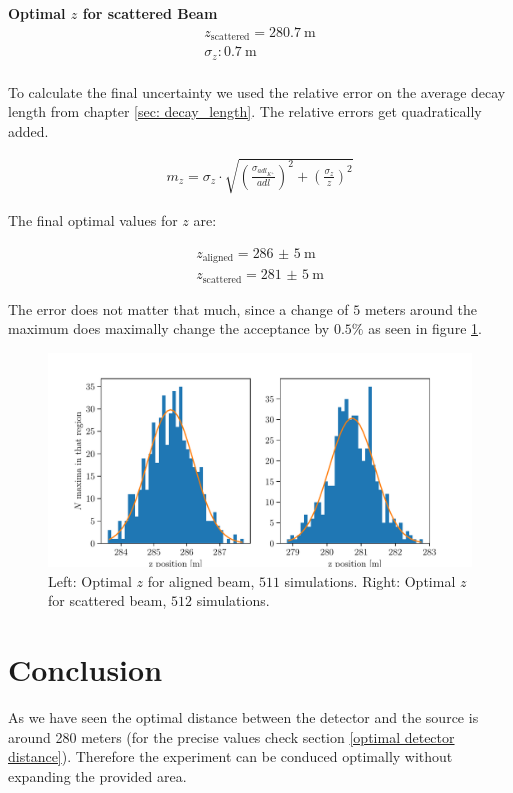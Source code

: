 \documentclass[12pt,a4paper,oneside,english]{article}
\begin{document}
	\textbf{Optimal $z$ for scattered Beam}
		\begin{align*}
		z_{\text{scattered}} = \SI{280.7}{\meter}\\
		\sigma _z  : \SI{0.7}{\meter}\\
		\end{align*}
		
		To calculate the final uncertainty we used the relative error on the average decay length from chapter \ref{sec: decay_length}. The relative errors get quadratically added.
		
		\begin{align}
			m_z = \sigma _z \cdot \sqrt{ \left(\frac{\sigma_{adl_{K^+}}}{adl}\right)^2 +  \left(\frac{\sigma_z}{z}\right)^2}
		\end{align}
		
		The final optimal values for $z$ are:
		
		\begin{align*}
			z_{\text{aligned}} =  \SI{286(5)}{\meter}\\
			z_{\text{scattered}} =  \SI{281(5)}{\meter}
		\end{align*}
		
		The error does not matter that much, since a change of $5$ meters around the maximum does maximally change the acceptance by $0.5\%$ as seen in figure \ref{fig:optimalzpos}.
		
\begin{figure}[H]
\centering
	\includegraphics[width=1\linewidth]{images/optimal_zpos.pdf}
	\caption{Left: Optimal $z$ for aligned beam, $511$ simulations. Right: Optimal $z$ for scattered beam, $512$ simulations.}
	\label{fig:optimalzpos}
\end{figure}

\section{Conclusion}
As we have seen the optimal distance between the detector and the source is around 280 meters (for the precise values check section \ref{optimal detector distance}). Therefore the experiment can be conduced optimally without expanding the provided area.
\end{document}
